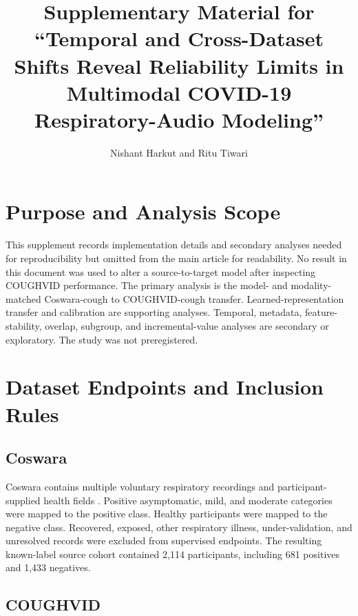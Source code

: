 \documentclass[journal]{IEEEtran}
\title{Supplementary Material for ``Temporal and Cross-Dataset Shifts Reveal Reliability Limits in Multimodal COVID-19 Respiratory-Audio Modeling''}
\author{Nishant Harkut and Ritu Tiwari}
\begin{document}
\maketitle

\section{Purpose and Analysis Scope}

This supplement records implementation details and secondary analyses needed for reproducibility but omitted from the main article for readability. No result in this document was used to alter a source-to-target model after inspecting COUGHVID performance. The primary analysis is the model- and modality-matched Coswara-cough to COUGHVID-cough transfer. Learned-representation transfer and calibration are supporting analyses. Temporal, metadata, feature-stability, overlap, subgroup, and incremental-value analyses are secondary or exploratory. The study was not preregistered.

\section{Dataset Endpoints and Inclusion Rules}

\subsection{Coswara}

Coswara contains multiple voluntary respiratory recordings and participant-supplied health fields \cite{bhattacharya2023coswara}. Positive asymptomatic, mild, and moderate categories were mapped to the positive class. Healthy participants were mapped to the negative class. Recovered, exposed, other respiratory illness, under-validation, and unresolved records were excluded from supervised endpoints. The resulting known-label source cohort contained 2,114 participants, including 681 positives and 1,433 negatives.

\subsection{COUGHVID}
\end{document}
